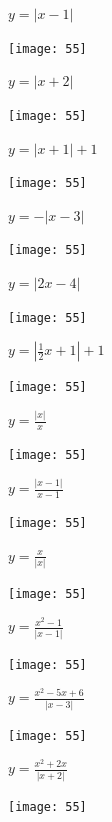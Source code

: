 \documentclass[a4paper]{oblivoir}
\begin{document}
\clearpage
\begin{minipage}{0.45\textwidth}\centering
\(y=|x-1|\)
\par\bigskip\texttt{[image: 55]}
\end{minipage}
\begin{minipage}{0.45\textwidth}\centering
\(y=|x+2|\)
\par\bigskip\texttt{[image: 55]}
\end{minipage}\bigskip\bigskip\par
\begin{minipage}{0.45\textwidth}\centering
\(y=|x+1|+1\)
\par\bigskip\texttt{[image: 55]}
\end{minipage}
\begin{minipage}{0.45\textwidth}\centering
\(y=-|x-3|\)
\par\bigskip\texttt{[image: 55]}
\end{minipage}\bigskip\bigskip\par
\begin{minipage}{0.45\textwidth}\centering
\(y=|2x-4|\)
\par\bigskip\texttt{[image: 55]}
\end{minipage}
\begin{minipage}{0.45\textwidth}\centering
\(y=|\frac12x+1|+1\)
\par\bigskip\texttt{[image: 55]}
\end{minipage}\bigskip\bigskip\par

\clearpage
\begin{minipage}{0.45\textwidth}\centering
\(y=\frac{|x|}{x}\)
\par\bigskip\texttt{[image: 55]}
\end{minipage}
\begin{minipage}{0.45\textwidth}\centering
\(y=\frac{|x-1|}{x-1}\)
\par\bigskip\texttt{[image: 55]}
\end{minipage}\bigskip\bigskip\par
\begin{minipage}{0.45\textwidth}\centering
\(y=\frac{x}{|x|}\)
\par\bigskip\texttt{[image: 55]}
\end{minipage}
\begin{minipage}{0.45\textwidth}\centering
\(y=\frac{x^2-1}{|x-1|}\)
\par\bigskip\texttt{[image: 55]}
\end{minipage}\bigskip\bigskip\par
\begin{minipage}{0.45\textwidth}\centering
\(y=\frac{x^2-5x+6}{|x-3|}\)
\par\bigskip\texttt{[image: 55]}
\end{minipage}
\begin{minipage}{0.45\textwidth}\centering
\(y=\frac{x^2+2x}{|x+2|}\)
\par\bigskip\texttt{[image: 55]}
\end{minipage}\bigskip\bigskip\par
\end{document}
